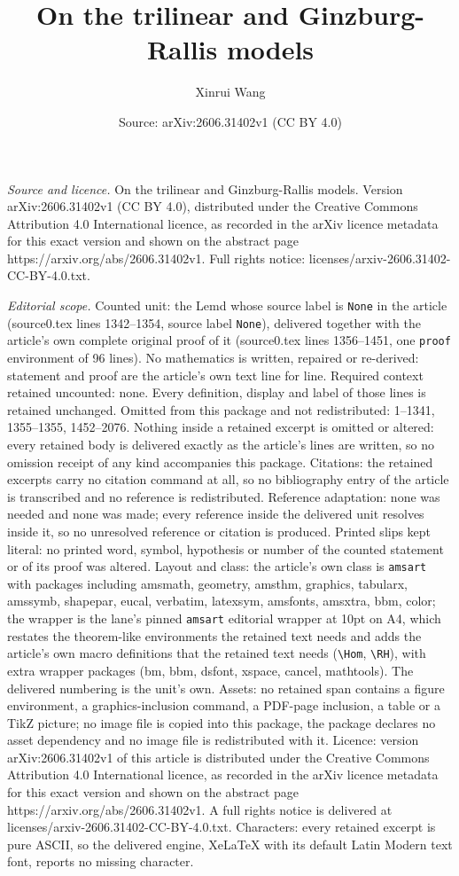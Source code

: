 \documentclass[10pt,a4paper]{amsart}
\title[On the trilinear and Ginzburg-Rallis models]{On the trilinear and Ginzburg-Rallis models}
\author{Xinrui Wang}
\date{Source: arXiv:2606.31402v1 (CC BY 4.0)}
\begin{document}
\maketitle

\noindent\emph{Source and licence.} On the trilinear and Ginzburg-Rallis models. Version arXiv:2606.31402v1 (CC BY 4.0), distributed under the Creative Commons Attribution 4.0 International licence, as recorded in the arXiv licence metadata for this exact version and shown on the abstract page https://arxiv.org/abs/2606.31402v1. Full rights notice: licenses/arxiv-2606.31402-CC-BY-4.0.txt.\par\smallskip

\noindent\textit{Editorial scope.} Counted unit: the Lemd whose source label is \texttt{None} in the article (source0.tex lines 1342--1354, source label \texttt{None}), delivered together with the article's own complete original proof of it (source0.tex lines 1356--1451, one \texttt{proof} environment of 96 lines). No mathematics is written, repaired or re-derived: statement and proof are the article's own text line for line. Required context retained uncounted: none. Every definition, display and label of those lines is retained unchanged. Omitted from this package and not redistributed: 1--1341, 1355--1355, 1452--2076. Nothing inside a retained excerpt is omitted or altered: every retained body is delivered exactly as the article's lines are written, so no omission receipt of any kind accompanies this package. Citations: the retained excerpts carry no citation command at all, so no bibliography entry of the article is transcribed and no reference is redistributed. Reference adaptation: none was needed and none was made; every reference inside the delivered unit resolves inside it, so no unresolved reference or citation is produced. Printed slips kept literal: no printed word, symbol, hypothesis or number of the counted statement or of its proof was altered. Layout and class: the article's own class is \texttt{amsart} with packages including amsmath, geometry, amsthm, graphics, tabularx, amssymb, shapepar, eucal, verbatim, latexsym, amsfonts, amsxtra, bbm, color; the wrapper is the lane's pinned \texttt{amsart} editorial wrapper at 10pt on A4, which restates the theorem-like environments the retained text needs and adds the article's own macro definitions that the retained text needs (\texttt{\textbackslash Hom}, \texttt{\textbackslash RH}), with extra wrapper packages (bm, bbm, dsfont, xspace, cancel, mathtools). The delivered numbering is the unit's own. Assets: no retained span contains a figure environment, a graphics-inclusion command, a PDF-page inclusion, a table or a TikZ picture; no image file is copied into this package, the package declares no asset dependency and no image file is redistributed with it. Licence: version arXiv:2606.31402v1 of this article is distributed under the Creative Commons Attribution 4.0 International licence, as recorded in the arXiv licence metadata for this exact version and shown on the abstract page https://arxiv.org/abs/2606.31402v1. A full rights notice is delivered at licenses/arxiv-2606.31402-CC-BY-4.0.txt. Characters: every retained excerpt is pure ASCII, so the delivered engine, XeLaTeX with its default Latin Modern text font, reports no missing character.
\end{document}
